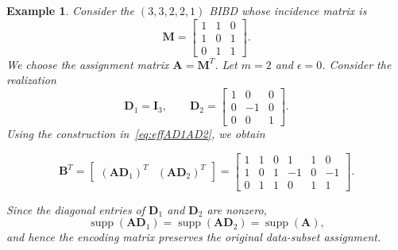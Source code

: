 \documentclass[journal,draftcls,onecolumn]{IEEEtran}
\theoremstyle{mystyle}
\newtheorem{example}{Example}
\newcommand{\bfA}{\mathbf{A}}
\newcommand{\bfM}{\mathbf{M}}
\newcommand{\aditya}[1]{\marginpar{+}{\bf Aditya's remark}: {\em #1}}
\newcommand{\sifat}[1]{\marginpar{+}{\bf Sifat's remark}: {\em #1}}
\begin{document}

\begin{example}
Consider the $(3,3,2,2,1)$ BIBD whose incidence matrix is
\[
\mathbf{M}
=
\begin{bmatrix}
1 & 1 & 0\\
1 & 0 & 1\\
0 & 1 & 1
\end{bmatrix}.
\]
We choose the assignment matrix $\bfA = \bfM^T$. Let $m=2$ and $\epsilon=0$. Consider the realization
\[
\mathbf{D}_1=\mathbf{I}_3,
\qquad
\mathbf{D}_2= \begin{bmatrix}
1 & 0 & 0\\
0 & -1 & 0\\
0 & 0 & 1
\end{bmatrix}.
\]
Using the construction in~\eqref{eq:effAD1AD2}, we obtain %

\[
\mathbf{B}^T
=
\begin{bmatrix}
(\mathbf{A}\mathbf{D}_1)^T & (\mathbf{A}\mathbf{D}_2)^T
\end{bmatrix}
=
\begin{bmatrix}
1 & 1 & 0 & 1 & 1 & 0\\
1 & 0 & 1 & -1 & 0 & -1\\
0 & 1 & 1 & 0 & 1 & 1
\end{bmatrix}.
\]

Since the diagonal entries of $\mathbf{D}_1$ and $\mathbf{D}_2$ are nonzero,
\[
\operatorname{supp}(\mathbf{A}\mathbf{D}_1)
=
\operatorname{supp}(\mathbf{A}\mathbf{D}_2)
=
\operatorname{supp}(\mathbf{A}),
\]
and hence the encoding matrix preserves the original data-subset assignment.
\end{example}




\end{document}
